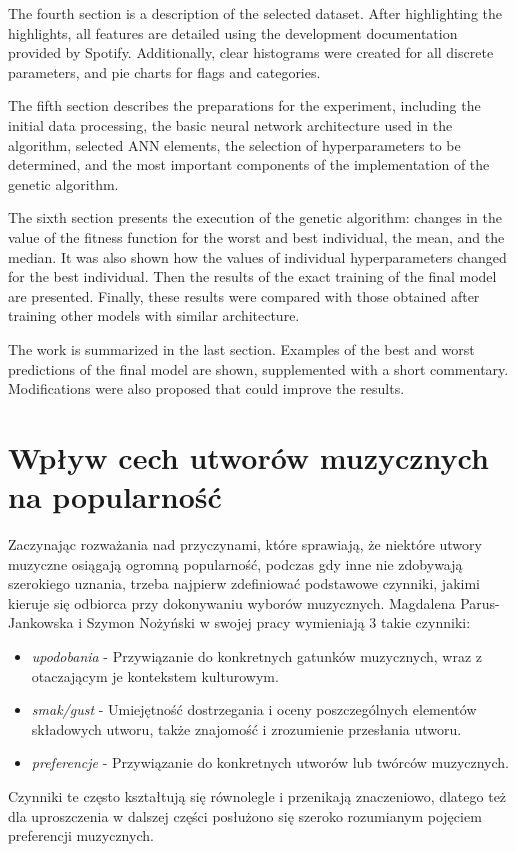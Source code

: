 \documentclass[a4paper,12pt]{article}
\numberwithin{figure}{section}
\begin{document}
    \bigskip

    The fourth section is a description of the selected dataset. After highlighting the highlights, all features are detailed using the development documentation provided by Spotify. Additionally, clear histograms were created for all discrete parameters, and pie charts for flags and categories.

    \bigskip


    The fifth section describes the preparations for the experiment, including the initial data processing, the basic neural network architecture used in the algorithm, selected ANN elements, the selection of hyperparameters to be determined, and the most important components of the implementation of the genetic algorithm.

    \bigskip

    The sixth section presents the execution of the genetic algorithm: changes in the value of the fitness function for the worst and best individual, the mean, and the median. It was also shown how the values of individual hyperparameters changed for the best individual. Then the results of the exact training of the final model are presented. Finally, these results were compared with those obtained after training other models with similar architecture.

    \bigskip

    The work is summarized in the last section. Examples of the best and worst predictions of the final model are shown, supplemented with a short commentary. Modifications were also proposed that could improve the results.

    \newpage


    \section{Wpływ cech utworów muzycznych na popularność}

    Zaczynając rozważania nad przyczynami, które sprawiają, że niektóre utwory muzyczne osiągają ogromną popularność, podczas gdy inne nie zdobywają szerokiego uznania, trzeba najpierw zdefiniować podstawowe czynniki, jakimi kieruje się odbiorca przy dokonywaniu wyborów muzycznych. Magdalena Parus-Jankowska i Szymon Nożyński w swojej pracy\cite{PreferencjeMuzyczneWCzasachSteamingu2020} wymieniają 3 takie czynniki:
    \begin{itemize}
        \item \textit{upodobania} - Przywiązanie do konkretnych gatunków muzycznych, wraz z otaczającym je kontekstem kulturowym.
        \item \textit{smak/gust} - Umiejętność dostrzegania i oceny poszczególnych elementów składowych utworu, także znajomość i zrozumienie przesłania utworu.
        \item \textit{preferencje} - Przywiązanie do konkretnych utworów lub twórców muzycznych.
    \end{itemize}
    \smallskip
    Czynniki te często kształtują się równolegle i przenikają znaczeniowo, dlatego też dla uproszczenia w dalszej części posłużono się szeroko rozumianym pojęciem preferencji muzycznych.
\end{document}
